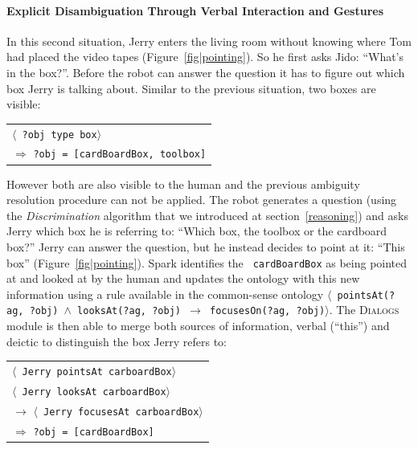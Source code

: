\documentclass[preprint,3p,times]{elsarticle}
\newcommand{\stmt}[1]{{\footnotesize \tt $\langle$ #1\relax$\rangle$}}
\begin{document}
\paragraph{Explicit Disambiguation Through Verbal Interaction and Gestures}

In this second situation, Jerry enters the living room without knowing where Tom had
placed the video tapes (Figure~\ref{fig|pointing}). So he first asks Jido:
``What's in the box?''. Before the robot can answer the question it has to
figure out which box Jerry is talking about. Similar to the previous situation,
two boxes are visible: 

\begin{center}
\begin{tabular}{l}
\stmt{?obj type box}\\
\hspace{0.7cm}$\Rightarrow$ {\tt ?obj = [cardBoardBox, toolbox]}
\end{tabular}
\end{center}

However both are also visible to the human and the previous ambiguity resolution
procedure can not be applied. The robot generates a question (using the
\emph{Discrimination} algorithm that we introduced at section~\ref{reasoning})
and asks Jerry which box he is referring to: ``Which box, the toolbox or the
cardboard box?'' Jerry can answer the question, but he instead decides to point
at it: ``This box'' (Figure~\ref{fig|pointing}). {\sc Spark} identifies the {\tt
cardBoardBox} as being pointed at and looked at by the human and updates the
ontology with this new information using a rule available in the common-sense
ontology \stmt{pointsAt(?ag, ?obj) $\land$ looksAt(?ag, ?obj) $\to$
focusesOn(?ag, ?obj)}. The \textsc{Dialogs} module is then able to merge both
sources of information, verbal (``this'') and deictic to distinguish the box
Jerry refers to:

\begin{center} 
    \begin{tabular}{l} 
        \stmt{Jerry pointsAt carboardBox}\\ 
        \stmt{Jerry looksAt carboardBox}\\ 
        $\to$ \stmt{Jerry focusesAt carboardBox}\\ 
        \hspace{0.7cm}$\Rightarrow$ {\tt ?obj = [cardBoardBox]}
    \end{tabular} 
\end{center}
\end{document}
